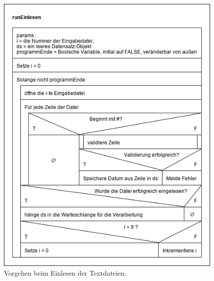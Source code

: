 \begin{figure}[htb]
    \centering
    \includegraphics[width=0.8\linewidth]{images/runEinlesen}
    \caption{
        Vorgehen beim Einlesen der Textdateien.
    }
    \label{fig:run-einlesen}
\end{figure}

